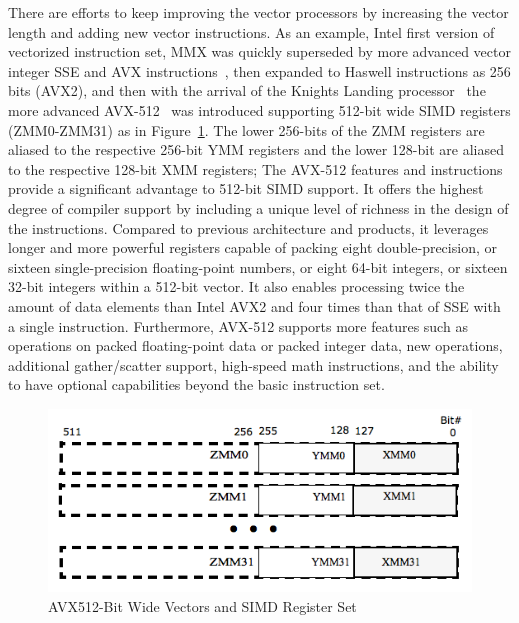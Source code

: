 \documentclass[sigconf]{acmart}
\begin{document}
There are efforts to keep improving the vector processors by increasing the vector
length and adding new vector instructions.
As an example, Intel first version of vectorized instruction set, MMX was quickly superseded by more advanced vector integer SSE and AVX instructions~\cite{intel_sse, intel_avx, avxsets},
then expanded to Haswell instructions as 256 bits (AVX2),
and then with the arrival of the Knights Landing processor~\cite{avx-info} the more advanced
AVX-512~\cite{Intelref} was introduced supporting 512-bit wide SIMD registers (ZMM0-ZMM31)
as in Figure~\ref{fig:avx_mms}. The lower 256-bits of the ZMM registers are
aliased to the respective 256-bit YMM registers and the lower 128-bit are
aliased to the respective 128-bit XMM registers;
%
The AVX-512 features and instructions provide a significant advantage to 512-bit SIMD support.
It offers the highest degree of compiler support by including a unique level of richness
in the design of the instructions.
%
Compared to previous architecture and products, it leverages longer and more
powerful registers capable of packing eight double-precision, or sixteen
single-precision floating-point numbers,
or eight 64-bit integers, or sixteen 32-bit integers within a 512-bit vector.
It also enables processing twice the amount of data elements than Intel AVX2 and four
times than that of SSE with a single instruction.
%
Furthermore,  AVX-512 supports more features such as operations on packed
floating-point data or packed integer data, new operations, additional
gather/scatter support, high-speed math instructions, and the ability to have
optional capabilities beyond the basic instruction set.

\begin{figure}[h]
    \centering
    \includegraphics[width=\linewidth]{avx_mms.png}
    \caption{AVX512-Bit Wide Vectors and SIMD Register Set}
    \label{fig:avx_mms}
\end{figure}
\end{document}
